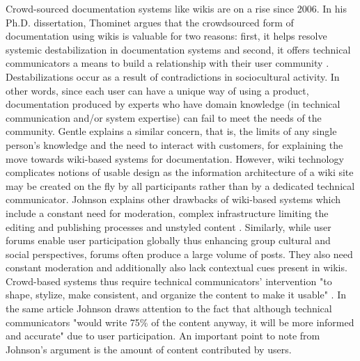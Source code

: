 Crowd-sourced documentation systems like wikis are on a rise since 2006. In his Ph.D. dissertation, Thominet argues that the crowdsourced form of documentation using wikis is valuable for two reasons: first, it helps resolve systemic destabilization in documentation systems and second, it offers technical communicators a means to build a relationship with their user community \cite{thominet2016emerging}. Destabilizations occur as a result of contradictions in sociocultural activity. In other words, since each user can have a unique way of using a product, documentation produced by experts who have domain knowledge (in technical communication and/or system expertise) can fail to meet the needs of the community. Gentle explains a similar concern, that is, the limits of any single person’s knowledge and the need to interact with customers, for explaining the move towards wiki-based systems for documentation. However, wiki technology complicates notions of usable design as the information architecture of a wiki site may be created on the fly by all participants rather than by a dedicated technical communicator. Johnson explains other drawbacks of wiki-based systems which include a constant need for moderation, complex infrastructure limiting the editing and publishing processes and unstyled content \cite{johnson1996relocating}. Similarly, while user forums enable user participation globally thus enhancing group cultural and social perspectives, forums often produce a large volume of posts. They also need constant moderation and additionally also lack contextual cues \cite{white2001receiving, o2009structured} present in wikis. Crowd-based systems thus require technical communicators' intervention "to shape, stylize, make consistent, and organize the content to make it usable" \cite{johnson_2007}. In the same article Johnson draws attention to the fact that although technical communicators "would write 75\% of the content anyway, it will be more informed and accurate" due to user participation. An important point to note from Johnson's argument is the amount of content contributed by users.

